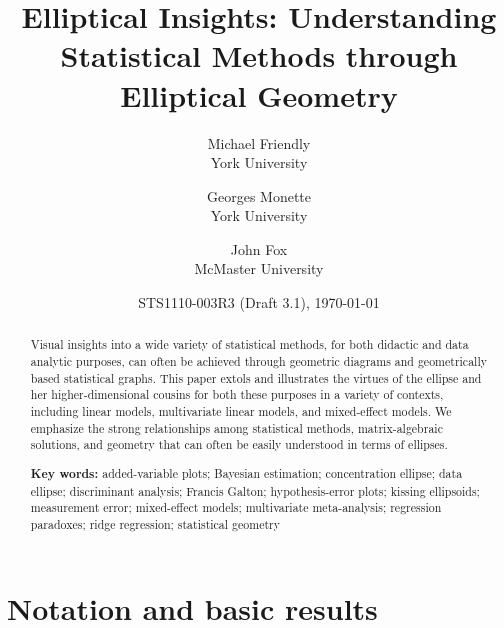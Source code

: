 \documentclass[11pt]{article}%
\newcommand{\keywords}[1]{\par\noindent\textbf{Key words:} #1}
\begin{document}
\begin{titlepage}
\title{Elliptical Insights: Understanding Statistical Methods through Elliptical Geometry}

\author{Michael Friendly%
 \\ York University
\and
Georges Monette \\ York University
\and
John Fox \\ McMaster University
}
\date{STS1110-003R3 (Draft 3.1), \today}
\end{titlepage}
\maketitle

\begin{abstract}
Visual insights into  a wide variety  of statistical methods,  for both didactic
and data analytic purposes, can often be achieved through geometric diagrams  and
geometrically based statistical graphs.  This  paper extols and illustrates  the
virtues  of  the  ellipse  and her  higher-dimensional  cousins  for  both these
purposes in a variety of contexts, including linear models, multivariate
linear models, and mixed-effect models.
We emphasize the strong relationships among statistical methods, matrix-algebraic
solutions, and geometry that can often be easily understood in terms of
ellipses.

\keywords{
added-variable plots;
Bayesian estimation;
concentration ellipse;
data ellipse;
discriminant analysis;
Francis Galton;
hypothesis-error plots;
kissing ellipsoids;
measurement error;
mixed-effect models;
multivariate meta-analysis;
regression paradoxes;
ridge regression;
statistical geometry
}
\end{abstract}



\section{Notation and basic results}\label{sec:notation}
\end{document}
